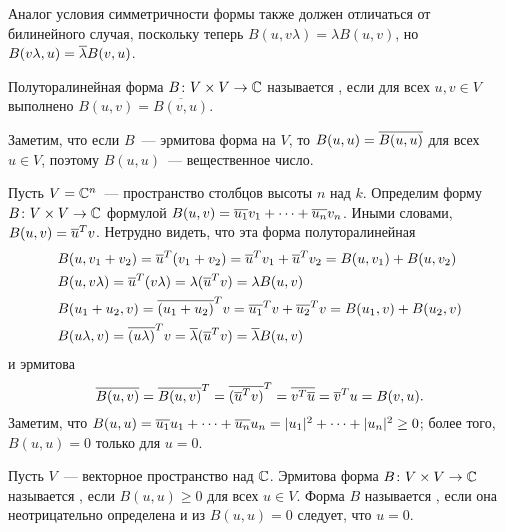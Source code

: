Аналог условия симметричности формы также должен отличаться от
билинейного случая, поскольку теперь $B(u,v\lambda)=\lambda B(u,v)$,
но $B(v\lambda,u) = \overline\lambda B(v,u)$.

\begin{definition}
Полуторалинейная форма $B\colon V\times V\to\mathbb C$ называется
, если для всех $u,v\in V$
выполнено $B(u,v) = \overline{B(v,u)}$.
\end{definition}

\begin{remark}\label{rem:hermitian_square_is_real}
Заметим, что если $B$~--- эрмитова форма на $V$, то $B(u,u) =
\overline{B(u,u)}$ для всех $u\in V$, поэтому $B(u,u)$~--- вещественное число.
\end{remark}

\begin{example}\label{example:standard_sesquilinear_form}
Пусть  $V=\mathbb C^n$~--- пространство столбцов
высоты $n$ над $k$. Определим форму $B\colon V\times V\to\mathbb C$
формулой $B(u,v) = \overline{u_1}v_1 + \dots + \overline{u_n}v_n$. Иными словами,
$B(u,v) = \overline{u}^Tv$. 
Нетрудно видеть, что эта форма полуторалинейная
\begin{align*}
&B(u,v_1+v_2) = \overline{u}^T(v_1+v_2) = \overline{u}^Tv_1 + \overline{u}^Tv_2 = B(u,v_1) +
B(u,v_2)\\
&B(u,v\lambda)=\overline{u}^T(v\lambda)=\lambda(\overline{u}^Tv)=\lambda B(u,v)\\
&B(u_1+u_2,v) = \overline{(u_1+u_2)}^Tv = \overline{u_1}^Tv + \overline{u_2}^Tv = B(u_1,v)
+ B(u_2,v)\\
&B(u\lambda,v)=\overline{(u\lambda)}^Tv=\overline\lambda(\overline{u}^Tv)=\overline\lambda B(u,v)\\
\end{align*}
и эрмитова
$$
\overline{B(u,v)} = \overline{B(u,v)}^T = \overline{(\overline{u}^Tv)}^T = \overline{v^T\overline{u}} =
\overline{v}^Tu = B(v,u).
$$
Заметим, что $B(u,u) = \overline{u_1}u_1 + \dots + \overline{u_n}u_n
= |u_1|^2 + \dots + |u_n|^2 \geq 0$; более того, $B(u,u) = 0$ только
для $u=0$.
\end{example}

\begin{definition}
Пусть $V$~--- векторное пространство над $\mathbb C$. Эрмитова
форма $B\colon V\times V\to\mathbb C$ называется , если
$B(u,u)\geq 0$ для всех $u\in V$. Форма $B$
называется , если она
неотрицательно определена и из $B(u,u)=0$ следует, что $u=0$.
\end{definition}

